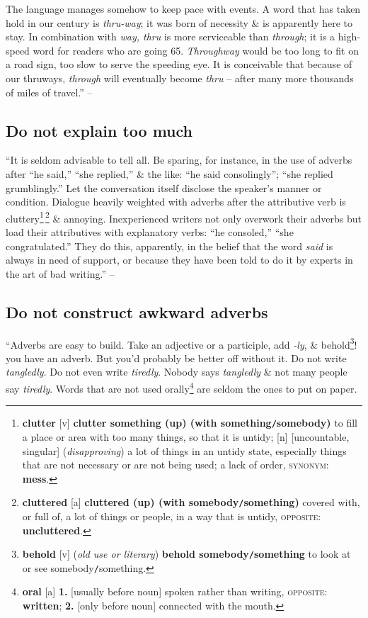 \documentclass[oneside]{book}
\numberwithin{equation}{section}
\begin{document}
The language manages somehow to keep pace with events. A word that has taken hold in our century is \textit{thru-way}; it was born of necessity \& is apparently here to stay. In combination with \textit{way, thru} is more serviceable than \textit{through}; it is a high-speed word for readers who are going 65. \textit{Throughway} would be too long to fit on a road sign, too slow to serve the speeding eye. It is conceivable that because of our thruways, \textit{through} will eventually become \textit{thru} -- after many more thousands of miles of travel.'' -- \cite[Chap. 5, Sect. 10, p. 88]{Strunk_White2019}

\subsection{Do not explain too much}
``It is seldom advisable to tell all. Be sparing, for instance, in the use of adverbs after ``he said,'' ``she replied,'' \& the like: ``he said consolingly''; ``she replied grumblingly.'' Let the conversation itself disclose the speaker's manner or condition. Dialogue heavily weighted with adverbs after the attributive verb is cluttery\footnote{\textbf{clutter} [v] \textbf{clutter something (up) (with something\texttt{/}somebody)} to fill a place or area with too many things, so that it is untidy; [n] [uncountable, singular] (\textit{disapproving}) a lot of things in an untidy state, especially things that are not necessary or are not being used; a lack of order, \textsc{synonym}: \textbf{mess}.}\,\footnote{\textbf{cluttered} [a] \textbf{cluttered (up) (with somebody\texttt{/}something)} covered with, or full of, a lot of things or people, in a way that is untidy, \textsc{opposite}: \textbf{uncluttered}.} \& annoying. Inexperienced writers not only overwork their adverbs but load their attributives with explanatory verbs: ``he consoled,'' ``she congratulated.'' They do this, apparently, in the belief that the word \textit{said} is always in need of support, or because they have been told to do it by experts in the art of bad writing.'' -- \cite[Chap. 5, Sect. 11, p. 89]{Strunk_White2019}

\subsection{Do not construct awkward adverbs}
``Adverbs are easy to build. Take an adjective or a participle, add \textit{-ly}, \& behold\footnote{\textbf{behold} [v] (\textit{old use or literary}) \textbf{behold somebody\texttt{/}something} to look at or see somebody\texttt{/}something.}! you have an adverb. But you'd probably be better off without it. Do not write \textit{tangledly}.  Do not even write \textit{tiredly}. Nobody says \textit{tangledly} \& not many people say \textit{tiredly}. Words that are not used orally\footnote{\textbf{oral} [a] \textbf{1.} [usually before noun] spoken rather than writing, \textsc{opposite}: \textbf{written}; \textbf{2.} [only before noun] connected with the mouth.} are seldom the ones to put on paper.
\end{document}
